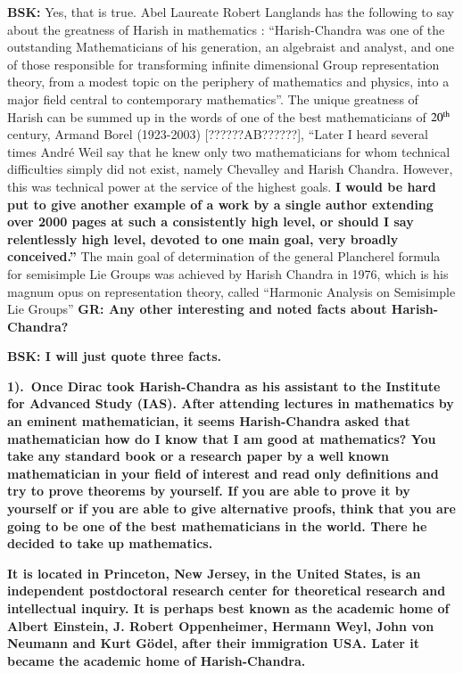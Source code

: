 \textbf{BSK:} Yes, that is true.  Abel Laureate Robert Langlands has the following to say about the greatness of Harish in mathematics \cite{chap13-key07RPL} : “Harish-Chandra was one of the outstanding Mathematicians of his generation, an algebraist and analyst, and one of those responsible for transforming infinite dimensional Group representation theory, from a modest topic on the periphery of mathematics and physics, into a major field central to contemporary mathematics”. The unique greatness of Harish can be summed up in the words of one of the best mathematicians of $20^{\rm th}$ century, Armand Borel (1923-2003) [??????AB??????], “Later I heard several times André Weil say that he knew only two mathematicians for whom technical difficulties simply did not exist, namely Chevalley and Harish Chandra.  However, this was technical power at the service of the highest goals. \textbf{I would be hard put to give another example of a work by a single author extending over 2000 pages at such a consistently high level, or should I say relentlessly high level, devoted to one main goal, very broadly conceived.”}  The main goal of determination of the general Plancherel formula for semisimple Lie Groups was achieved by Harish Chandra in 1976, which is his magnum opus on representation theory, called “Harmonic Analysis on Semisimple Lie Groups” \textbf{GR: Any other interesting and noted facts about Harish-Chandra?}

\textbf{BSK:  I will just quote three facts.}

\textbf{1).~Once Dirac took Harish-Chandra as his assistant to  the Institute for Advanced Study (IAS). After attending  lectures in mathematics by an eminent mathematician,  it seems Harish-Chandra asked that mathematician how do I know that I am good at mathematics? You take any standard book or a research paper by a well known mathematician in your field of interest and read only definitions and try to prove theorems by yourself. If you are able to prove it by yourself or if you are able to give alternative proofs, think that you are going to be one of the best mathematicians in the world. There he decided to take up mathematics.}

\textbf{It is located in Princeton, New Jersey, in the United States, is an independent postdoctoral research center for theoretical research and intellectual inquiry. It is perhaps best known as the academic home of Albert Einstein, J. Robert Oppenheimer, Hermann Weyl, John von Neumann and Kurt Gödel, after their immigration USA. \small{Later it became the academic home of Harish-Chandra.}}

